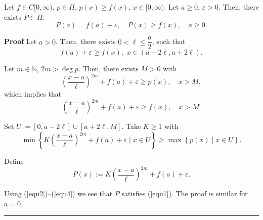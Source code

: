 \documentclass[10pt,a4paper]{amsart}
\newenvironment{proof}[1][Proof]{\noindent \textbf{#1} }{\  \rule{0.5em}{0.5em}}
\begin{document}
\begin{lemma}\label{L6.1} Let $f \in C[0,\infty)$, $p \in \Pi$, $p(x) \geq f(x)$, $x \in [0,\infty)$.
	Let $a \geq 0$, $\varepsilon > 0$. Then, there exists  $P \in \Pi$:
	\begin{equation}\label{equ1}
		P(a) = f(a) + \varepsilon, \quad P(x) \geq f(x), \quad x \geq 0.
	\end{equation}
\end{lemma}

\begin{proof} Let $a>0$. Then, there exists $ 0 < \ell \leq \dfrac{a}{2}$, such that
	\begin{equation}\label{equ2}f(a) + \varepsilon \geq f(x), \,\,x \in (a - 2\ell, a + 2\ell).\end{equation}
	
	
	Let $m \in \mathbb{N}$, $2m > \deg p$. Then, there exists $ M > 0$ with
	\[
	\left( \frac{x - a}{\ell} \right)^{2m} + f(a) + \varepsilon \geq p(x), \quad x > M,
	\]
	which implies that
	\begin{equation}\label{equ3}
		\left( \frac{x - a}{\ell} \right)^{2m} + f(a) + \varepsilon \geq f(x), \quad x > M.
	\end{equation}
	
	Set $U := [0, a - 2\ell] \cup [a + 2\ell, M]$. Take $K \geq 1$ with
	\begin{equation}\label{equ4}
		\min \left\{ K \left( \frac{x - a}{\ell} \right)^{2m} + f(a) + \varepsilon \mid x \in U \right\}
		\geq
		\max \left\{ p(x) \mid x \in U \right\}.
	\end{equation}
	
	Define
	\[
	P(x) := K \left( \frac{x - a}{\ell} \right)^{2m} + f(a) + \varepsilon.
	\]
	
	Using (\ref{equ2})--(\ref{equ4}) we see that $P$ satisfies (\ref{equ1}). The proof is similar for  $a = 0$. \end{proof}
\end{document}
